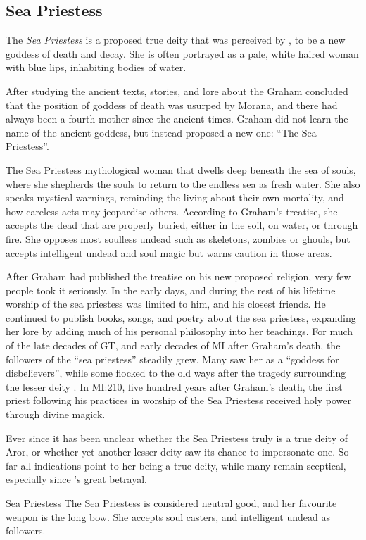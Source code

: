 \subsection{Sea Priestess}
\label{sec:Sea Priestess}

The \emph{Sea Priestess} is a proposed true deity that was perceived by
, to be a new goddess of death and decay. She is
often portrayed as a pale, white haired woman with blue lips, inhabiting
bodies of water.

After studying the ancient texts, stories, and lore about the  Graham concluded that the position of goddess of death was usurped by
Morana, and there had always been a fourth mother since the ancient times.
Graham did not learn the name of the ancient goddess, but instead proposed a
new one: ``The Sea Priestess''.

The Sea Priestess mythological woman that dwells deep beneath the
\hyperref[sec:Well of Souls]{sea of souls}, where she shepherds the souls to
return to the endless sea as fresh water. She also speaks mystical warnings,
reminding the living about their own mortality, and how careless acts may
jeopardise others. According to Graham's treatise, she accepts the dead that
are properly buried, either in the soil, on water, or through fire. She
opposes most soulless undead such as skeletons, zombies or ghouls, but accepts
intelligent undead and soul magic but warns caution in those areas.

After Graham had published the treatise on his new proposed religion, very
few people took it seriously. In the early days, and during the rest of his
lifetime worship of the sea priestess was limited to him, and his closest
friends. He continued to publish books, songs, and poetry about the sea
priestess, expanding her lore by adding much of his personal philosophy into
her teachings. For much of the late decades of GT, and early decades of MI
after Graham's death, the followers of the ``sea priestess'' steadily grew.
Many saw her as a ``goddess for disbelievers'', while some flocked to the old
ways after the tragedy surrounding the lesser deity .
In MI:210, five hundred years after Graham's death, the first priest following
his practices in worship of the Sea Priestess received holy power through
divine magick.

Ever since it has been unclear whether the Sea Priestess truly is a true deity
of Aror, or whether yet another lesser deity saw its chance to impersonate
one. So far all indications point to her being a true deity, while many remain
sceptical, especially since 's great betrayal.

\begin{35e}{Sea Priestess}
  The Sea Priestess is considered neutral good, and her favourite weapon is
  the long bow. She accepts soul casters, and intelligent undead as followers.
\end{35e}
